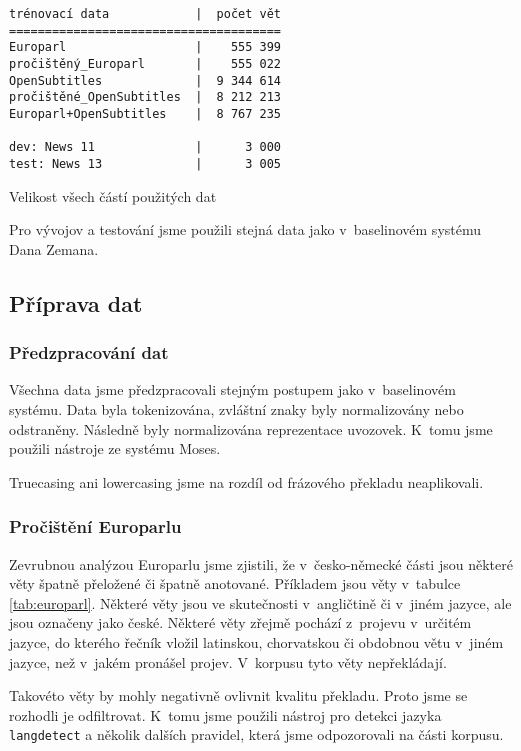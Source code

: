 \documentclass[a4]{article}
\begin{document}
\begin{table}[ht]
\begin{verbatim}
trénovací data            |  počet vět
======================================
Europarl                  |    555 399
pročištěný_Europarl       |    555 022
OpenSubtitles             |  9 344 614
pročištěné_OpenSubtitles  |  8 212 213
Europarl+OpenSubtitles    |  8 767 235
                          
dev: News 11              |      3 000
test: News 13             |      3 005
\end{verbatim}
\caption{Velikost všech částí použitých dat}
\label{tab:data}
\end{table}


Pro vývojov a testování jsme použili stejná data jako v~baselinovém systému
Dana Zemana.

\subsection{Příprava dat}

\subsubsection{Předzpracování dat}

Všechna data jsme předzpracovali stejným postupem jako v~baselinovém
systému. Data byla tokenizována, zvláštní znaky byly
normalizovány nebo odstraněny. Následně byly normalizována reprezentace
uvozovek. K~tomu jsme použili nástroje ze systému Moses\cite{moses}.

Truecasing ani lowercasing jsme na rozdíl od frázového překladu neaplikovali.


\subsubsection{Pročištění Europarlu}

Zevrubnou analýzou Europarlu jsme zjistili, že v~česko-německé části jsou některé
věty špatně přeložené či špatně anotované. Příkladem jsou věty v~tabulce
\ref{tab:europarl}. Některé věty jsou ve skutečnosti v~angličtině či v~jiném
jazyce, ale jsou označeny jako české. Některé věty zřejmě pochází
z~projevu v~určitém jazyce, do kterého řečník vložil latinskou, chorvatskou
či obdobnou větu v~jiném jazyce, než v~jakém pronášel projev. V~korpusu
tyto věty nepřekládají. 

Takovéto věty by mohly negativně ovlivnit kvalitu překladu. Proto jsme se
rozhodli je odfiltrovat. K~tomu jsme použili
nástroj pro detekci jazyka {\tt langdetect}\cite{langdetect} a několik
dalších pravidel, která jsme odpozorovali na části korpusu.
\end{document}
